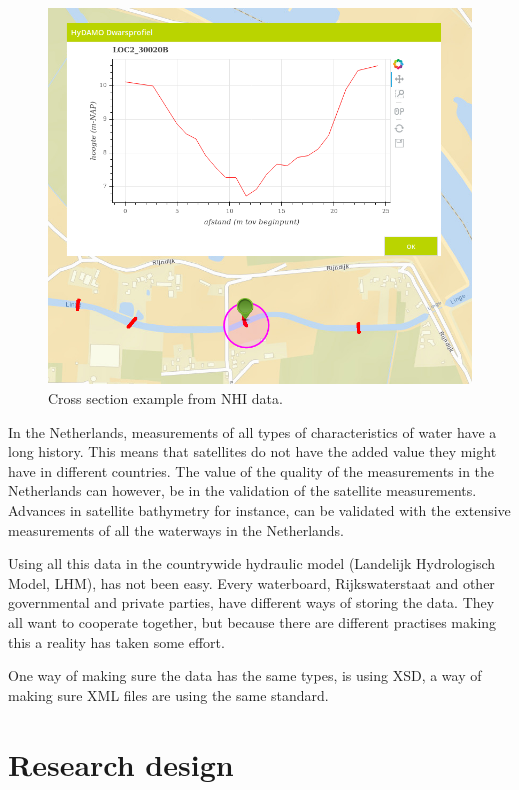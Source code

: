 \documentclass{article}
\begin{document}
\begin{figure}[h]
    \centering
    \includegraphics[width=\textwidth]{figures/cross_section_example.png}
    \caption{Cross section example from NHI data.\cite{NHI2019NHIPortaal}}
    \label{fig:nhi_data_cross_section}
\end{figure}

In the Netherlands, measurements of all types of characteristics of water have a long history. 
This means that satellites do not have the added value they might have in different countries. 
The value of the quality of the measurements in the Netherlands can however, be in the validation of the satellite measurements.
Advances in satellite bathymetry for instance, can be validated with the extensive measurements of all the waterways in the Netherlands.

Using all this data in the countrywide hydraulic model (Landelijk Hydrologisch Model, LHM), has not been easy. 
Every waterboard, Rijkswaterstaat and other governmental and private parties, have different ways of storing the data. 
They all want to cooperate together, but because there are different practises making this a reality has taken some effort.

One way of making sure the data has the same types, is using XSD, a way of making sure XML files are using the same standard\cite{XSDStandaardisatie}.

\section{Research design}
\end{document}
